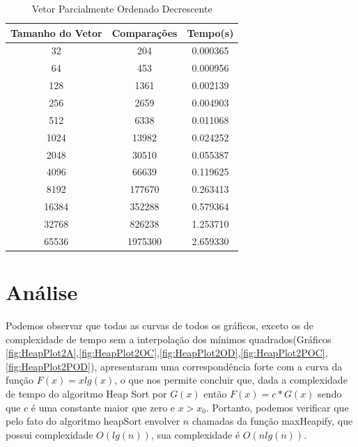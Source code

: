 \documentclass[12pt,a4paper,twoside]{report}
\begin{document}
\begin{table}[h]
  \centering
  \caption{Vetor Parcialmente Ordenado Decrescente \label{tab:pod}}
  \begin{tabular}{ccc} \\\hline
  \textbf{Tamanho do Vetor} & \textbf{Comparações} & \textbf{Tempo(s)}  \\\hline
  32                        & 204                  & 0.000365          \\\hline
  64                        & 453                 & 0.000956          \\\hline
  128                       & 1361                 & 0.002139          \\\hline
  256                       & 2659                & 0.004903          \\\hline
  512                       & 6338               & 0.011068          \\\hline
  1024                      & 13982               & 0.024252          \\\hline
  2048                      & 30510              & 0.055387          \\\hline
  4096                      & 66639              & 0.119625         \\\hline
  8192                      & 177670             & 0.263413        \\\hline
  16384                     & 352288            & 0.579364        \\\hline
  32768                     & 826238            & 1.253710        \\\hline
  65536                     & 1975300            & 2.659330        \\\hline

  \end{tabular}
\end{table}


\chapter{Análise}

Podemos observar que todas as curvas de todos os gráficos, exceto os de complexidade de tempo sem a interpolação dos mínimos quadrados(Gráficos \ref{fig:HeapPlot2A},\ref{fig:HeapPlot2OC},\ref{fig:HeapPlot2OD},\ref{fig:HeapPlot2POC},\ref{fig:HeapPlot2POD}), apresentaram uma correspondência forte com a curva da função $F(x) = x lg(x)$, o que nos permite concluir que, dada a complexidade de tempo do algoritmo Heap Sort por $G(x)$ então $F(x) = c * G(x)$ sendo que $c$ é uma constante maior que zero e $x > x_0$. Portanto, podemos verificar que pelo fato do algoritmo heapSort envolver $n$ chamadas da função maxHeapify, que possui complexidade $O(lg(n))$, sua complexidade é $O(n lg(n))$.
\end{document}
